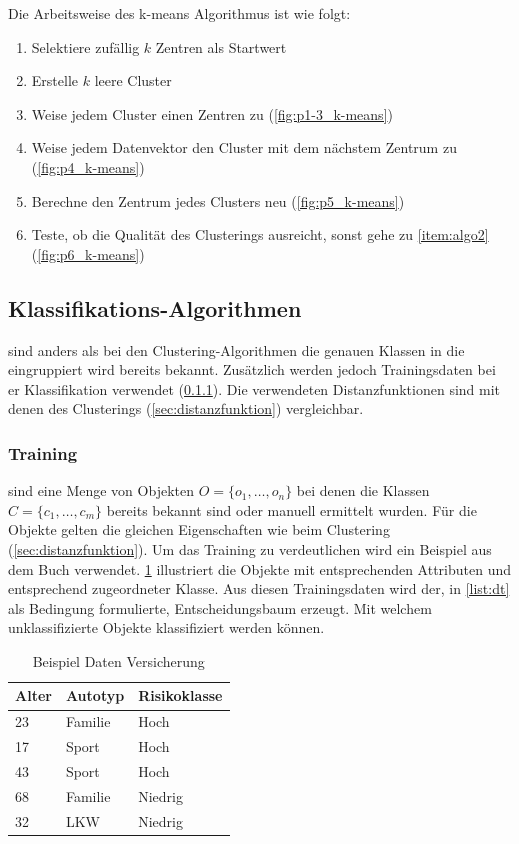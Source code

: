 \documentclass[12pt,journal,compsoc,ngerman]{IEEEtran}
\begin{document}
Die Arbeitsweise des k-means Algorithmus ist wie folgt:
\begin{enumerate}
\item Selektiere zufällig $k$ Zentren als Startwert
\item Erstelle $k$ leere Cluster \label{item:algo2}
\item Weise jedem Cluster einen Zentren zu (\cref{fig:p1-3_k-means})
\item Weise jedem Datenvektor den Cluster mit dem nächstem Zentrum zu (\cref{fig:p4_k-means})
\item Berechne den Zentrum jedes Clusters neu (\cref{fig:p5_k-means})
\item Teste, ob die Qualität des Clusterings ausreicht, sonst gehe zu \cref{item:algo2} (\cref{fig:p6_k-means})
\end{enumerate}

\subsection{Klassifikations-Algorithmen}
 sind anders als bei den Clustering-Algorithmen die genauen Klassen in die eingruppiert wird bereits bekannt. Zusätzlich werden jedoch Trainingsdaten bei er Klassifikation verwendet (\cref{sec:training}). Die verwendeten Distanzfunktionen sind mit denen des Clusterings (\cref{sec:distanzfunktion}) vergleichbar.

\subsubsection{Training}\label{sec:training}
 sind eine Menge von Objekten $O = \{o_1, \ldots, o_n\}$ bei denen die Klassen $C = \{c_1, \ldots, c_m\}$ bereits bekannt sind oder manuell ermittelt wurden. Für die Objekte gelten die gleichen Eigenschaften wie beim Clustering (\cref{sec:distanzfunktion}). Um das Training zu verdeutlichen wird ein Beispiel aus dem Buch \cite{ester2000knowledge} verwendet. \cref{tab:trainingdata} illustriert die Objekte mit entsprechenden Attributen und entsprechend zugeordneter Klasse. Aus diesen Trainingsdaten wird der, in \cref{list:dt} als Bedingung formulierte, Entscheidungsbaum erzeugt. Mit welchem unklassifizierte Objekte klassifiziert werden können. 

\begin{table}[!t]
\caption{Beispiel Daten Versicherung}
\centering
\begin{tabular}{l|l|l}\hline
Alter	& Autotyp	& Risikoklasse \\\hline
23	& Familie	& Hoch\\
17	& Sport		& Hoch\\
43	& Sport		& Hoch\\
68	& Familie	& Niedrig\\
32	& LKW		& Niedrig
\end{tabular}
\label{tab:trainingdata}
\end{table}
\end{document}

